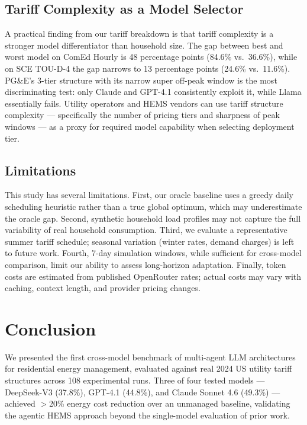 \documentclass[conference]{IEEEtran}
\begin{document}
\subsection{Tariff Complexity as a Model Selector}

A practical finding from our tariff breakdown is that tariff complexity
is a stronger model differentiator than household size.
The gap between best and worst model on ComEd Hourly is 48 percentage
points (84.6\% vs.\ 36.6\%), while on SCE TOU-D-4 the gap narrows
to 13 percentage points (24.6\% vs.\ 11.6\%).
PG\&E's 3-tier structure with its narrow super off-peak window is the
most discriminating test: only Claude and GPT-4.1 consistently exploit it,
while Llama essentially fails.
Utility operators and HEMS vendors can use tariff structure complexity ---
specifically the number of pricing tiers and sharpness of peak windows ---
as a proxy for required model capability when selecting deployment tier.

\subsection{Limitations}

This study has several limitations.
First, our oracle baseline uses a greedy daily scheduling heuristic
rather than a true global optimum, which may underestimate the oracle gap.
Second, synthetic household load profiles may not capture the full
variability of real household consumption.
Third, we evaluate a representative summer tariff schedule; seasonal
variation (winter rates, demand charges) is left to future work.
Fourth, 7-day simulation windows, while sufficient for cross-model
comparison, limit our ability to assess long-horizon adaptation.
Finally, token costs are estimated from published OpenRouter rates;
actual costs may vary with caching, context length, and provider pricing changes.

\section{Conclusion}
\label{sec:conclusion}

We presented the first cross-model benchmark of multi-agent LLM
architectures for residential energy management, evaluated against
real 2024 US utility tariff structures across 108 experimental runs.
Three of four tested models --- DeepSeek-V3 (37.8\%), GPT-4.1 (44.8\%),
and Claude Sonnet 4.6 (49.3\%) --- achieved $>$20\% energy cost reduction
over an unmanaged baseline, validating the agentic HEMS approach beyond
the single-model evaluation of prior work.
\end{document}

